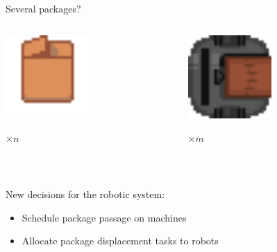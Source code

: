\begin{frame}{Several packages?}
    \begin{columns}
        \begin{column}{0.5\textwidth}
            \centering
            \includegraphics[width = 0.5\textwidth]{images/godot/package.png}
            
            \Large $\times n$
        \end{column}
        \begin{column}{0.5\textwidth}
            \centering
            \includegraphics[width = 0.5\textwidth]{images/godot/robot_texture.png}
            
            \LARGE $\times m$
        \end{column}
    \end{columns}
    
    ~

    New decisions for the robotic system:
    \begin{itemize}
        \item Schedule package passage on machines
        \item Allocate package displacement tasks to robots
    \end{itemize}

    \centering
\end{frame}

